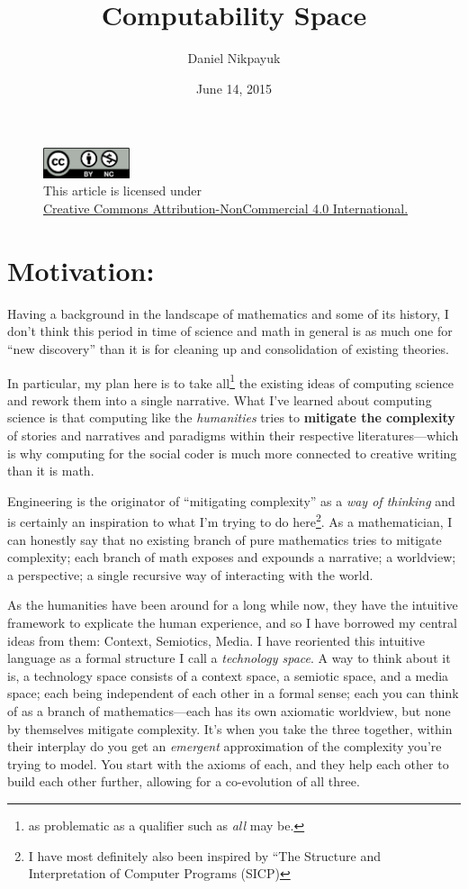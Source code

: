 \documentclass[twoside]{article}
\title{Computability Space}
\author{Daniel Nikpayuk}
\date{June 14, 2015}
\begin{document}
\maketitle
\begin{figure}[h]
\centering
\includegraphics[width=1in]{../../../cc-by-nc.png}\\[0.1in]
\tiny This article is licensed under \\
\href{http://creativecommons.org/licenses/by-nc/4.0/}
{Creative Commons Attribution-NonCommercial 4.0 International.}\\[0.3in]
\end{figure}

\section*{Motivation:}

Having a background in the landscape of mathematics and some of its history, I don't think this period in time of science
and math in general is as much one for ``new discovery'' than it is for cleaning up and consolidation of existing theories.

In particular, my plan here is to take all\footnote{as problematic as a qualifier such as \emph{all} may be.} the existing
ideas of computing science and rework them into a single narrative.  What I've learned about computing science is that
computing like the \emph{humanities} tries to {\bfseries mitigate the complexity} of stories and narratives and paradigms
within their respective literatures---which is why computing for the social coder is much more connected to creative writing
than it is math.

Engineering is the originator of ``mitigating complexity'' as a \emph{way of thinking} and is certainly an inspiration to what I'm
trying to do here\footnote{I have most definitely also been inspired by ``The Structure and Interpretation of Computer Programs (SICP)}.
As a mathematician, I can honestly say that no existing branch of pure mathematics tries to mitigate complexity; each branch of math
exposes and expounds a narrative; a worldview; a perspective; a single recursive way of interacting with the world.

As the humanities have been around for a long while now, they have the intuitive framework to explicate the human experience, and so
I have borrowed my central ideas from them: Context, Semiotics, Media. I have reoriented this intuitive language as a formal structure
I call a \emph{technology space}. A way to think about it is, a technology space consists of a context space, a semiotic space, and a
media space; each being independent of each other in a formal sense; each you can think of as a branch of mathematics---each has its
own axiomatic worldview, but none by themselves mitigate complexity. It's when you take the three together, within their interplay do
you get an \emph{emergent} approximation of the complexity you're trying to model. You start with the axioms of each, and they help each
other to build each other further, allowing for a co-evolution of all three.
\end{document}
